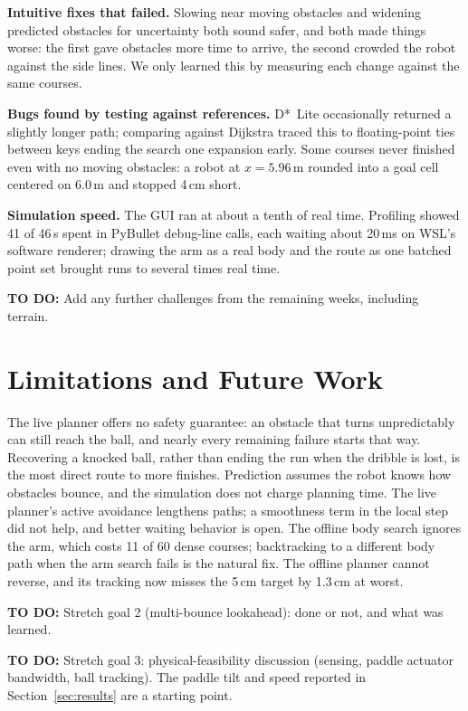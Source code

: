 \documentclass[10pt,twocolumn]{article}
\newcommand{\gap}[1]{\par\noindent\colorbox{yellow!40}{\parbox{\dimexpr\linewidth-2\fboxsep}{\small\textbf{TO DO:} #1}}\par}
\begin{document}
\textbf{Intuitive fixes that failed.} Slowing near moving obstacles and
widening predicted obstacles for uncertainty both sound safer, and both
made things worse: the first gave obstacles more time to arrive, the
second crowded the robot against the side lines. We only learned this by
measuring each change against the same courses.

\textbf{Bugs found by testing against references.} D*~Lite occasionally
returned a slightly longer path; comparing against Dijkstra traced this to
floating-point ties between keys ending the search one expansion early.
Some courses never finished even with no moving obstacles: a robot at
$x = 5.96$\,m rounded into a goal cell centered on 6.0\,m and stopped
4\,cm short.

\textbf{Simulation speed.} The GUI ran at about a tenth of real time.
Profiling showed 41 of 46\,s spent in PyBullet debug-line calls, each
waiting about 20\,ms on WSL's software renderer; drawing the arm as a real
body and the route as one batched point set brought runs to several times
real time.

\gap{Add any further challenges from the remaining weeks, including
terrain.}

\section{Limitations and Future Work}
The live planner offers no safety guarantee: an obstacle that turns
unpredictably can still reach the ball, and nearly every remaining failure
starts that way. Recovering a knocked ball, rather than ending the run
when the dribble is lost, is the most direct route to more finishes.
Prediction assumes the robot knows how obstacles bounce, and the
simulation does not charge planning time. The live planner's active
avoidance lengthens paths; a smoothness term in the local step did not
help, and better waiting behavior is open. The offline body search ignores
the arm, which costs 11 of 60 dense courses; backtracking to a different
body path when the arm search fails is the natural fix. The offline
planner cannot reverse, and its tracking now misses the 5\,cm target by
1.3\,cm at worst.

\gap{Stretch goal 2 (multi-bounce lookahead): done or not, and what was
learned.}

\gap{Stretch goal 3: physical-feasibility discussion (sensing, paddle
actuator bandwidth, ball tracking). The paddle tilt and speed reported in
Section~\ref{sec:results} are a starting point.}
\end{document}
